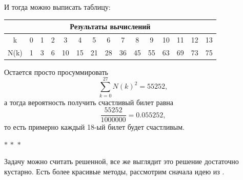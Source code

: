 \documentclass[a4paper,12pt]{article}
\newcommand{\threestars}{\begin{center}$ {\ast}\,{\ast}\,{\ast} $\end{center}}
\newcounter{th-counter}
\newcounter{col-counter}
\begin{document}
И тогда можно выписать таблицу:\\

\begin{center}
    \begin{tabular}{|*{15}{c|}} %
    \hline
    \multicolumn{15}{|c|}{\textbf{Результаты вычислений}} \\
    \hline
    k & 0 & 1 & 2 & 3 & 4 & 5 & 6 & 7 & 8 & 9 & 10 &
    11 & 12 & 13 \\
    \hline
    N(k) & 1 & 3 & 6 & 10 & 15 & 21 & 28 & 36 & 45 &
    55 & 63 & 69 & 73 & 75\\
    \hline
    \end{tabular}
\end{center}

Остается просто просуммировать
\[
\sum_{k=0}^{27} N(k)^2 = 55252,
\]
а тогда вероятность получить счастливый билет равна
\[
\frac{55252}{1000000} = 0.055252,
\]
то есть примерно каждый 18-ый билет будет счастливым.

\threestars

Задачу можно считать решенной, все же выглядит это решение достаточно кустарно. Есть более красивые методы, рассмотрим сначала идею из \cite{OneMoreTimeAboutHappyTickets}.



\newpage
\nocite{*}
\printbibliography[nottype=unpublished]
\end{document}
